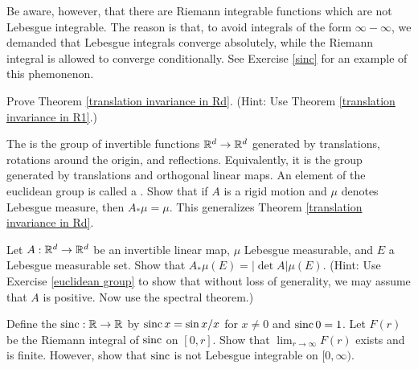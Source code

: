 Be aware, however, that there are Riemann integrable functions which are not Lebesgue integrable.
The reason is that, to avoid integrals of the form $\infty - \infty$, we demanded that Lebesgue integrals converge absolutely, while the Riemann integral is allowed to converge conditionally.
See Exercise \ref{sinc} for an example of this phemonenon.

\begin{exercise}
\label{translation invariance exer}
Prove Theorem \ref{translation invariance in Rd}. (Hint: Use Theorem \ref{translation invariance in R1}.)
\end{exercise}

\begin{exercise}
\label{euclidean group}
The  is the group of invertible functions $\mathbb{R}^d \to \mathbb{R}^d$ generated by translations, rotations around the origin, and reflections. Equivalently, it is the group generated by translations and orthogonal linear maps.
An element of the euclidean group is called a . Show that if $A$ is a rigid motion and $\mu$ denotes Lebesgue measure, then $A_*\mu = \mu$.
This generalizes Theorem \ref{translation invariance in Rd}.
\end{exercise}

\begin{exercise}
Let $A: \mathbb{R}^d \to \mathbb{R}^d$ be an invertible linear map, $\mu$ Lebesgue measurable, and $E$ a Lebesgue measurable set. Show that $A_*\mu(E) = |\det A|\mu(E)$.
(Hint: Use Exercise \ref{euclidean group} to show that without loss of generality, we may assume that $A$ is positive. Now use the spectral theorem.)
\end{exercise}

\begin{exercise}
\label{sinc}
Define the  $\operatorname{sinc}: \mathbb{R} \to \mathbb{R}$ by $\operatorname{sinc} x = \sin x/x$ for $x \neq 0$ and $\operatorname{sinc} 0 = 1$.
Let $F(r)$ be the Riemann integral of $\operatorname{sinc}$ on $[0, r]$. Show that $\lim_{r \to \infty} F(r)$ exists and is finite.
However, show that $\operatorname{sinc}$ is not Lebesgue integrable on $[0, \infty)$.
\end{exercise}

